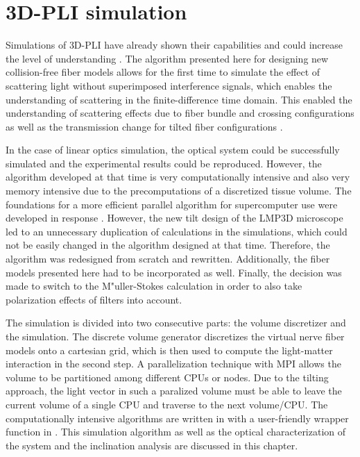 \cleardoublepage
\setcounter{chapter}{4}
\chapter{\acs{3D-PLI} simulation}
\label{cha:sof:simulation}
%
Simulations of \ac{3D-PLI} have already shown their capabilities and could increase the level of understanding \cite{Dohmen2015,Menzel2015,Menzel2016,Menzel2020,Menzel2021,MenzelMaster,MenzelDissertation}.
The algorithm presented here for designing new collision-free fiber models allows for the first time to simulate the effect of scattering light without superimposed interference signals, which enables the understanding of scattering in the finite-difference time domain.
This enabled the understanding of scattering effects due to fiber bundle and crossing configurations as well as the transmission change for tilted fiber configurations \cite{MenzelDissertation,Menzel2020,Menzel2021}.
\par
% 
In the case of linear optics simulation, the optical system could be successfully simulated and the experimental results \cite{Dohmen2015,Menzel2016} could be reproduced.
However, the algorithm developed at that time is very computationally intensive and also very memory intensive due to the precomputations of a discretized tissue volume.
The foundations for a more efficient parallel algorithm for supercomputer use were developed in response \cite{Lucksch2016}.
However, the new tilt design of the LMP3D microscope led to an unnecessary duplication of calculations in the simulations, which could not be easily changed in the algorithm designed at that time.
Therefore, the algorithm was redesigned from scratch and rewritten.
Additionally, the fiber models presented here had to be incorporated as well.
Finally, the decision was made to switch to the M"{u}ller-Stokes calculation in order to also take polarization effects of filters into account.
\par
%
The simulation is divided into two consecutive parts: the volume discretizer and the simulation.
The discrete volume generator discretizes the virtual nerve fiber models onto a cartesian grid, which is then used to compute the light-matter interaction in the second step.
A parallelization technique with \ac{MPI} allows the volume to be partitioned among different \acp{CPU} or nodes.
Due to the tilting approach, the light vector in such a paralized volume must be able to leave the current volume of a single \ac{CPU} and traverse to the next volume/\ac{CPU}.
The computationally intensive algorithms are written in \cpp{} with a user-friendly wrapper function in \python{}.
This simulation algorithm as well as the optical characterization of the system and the inclination analysis are discussed in this chapter.
%
% 
% 
